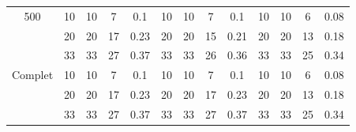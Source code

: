 \documentclass[a4paper,11pt]{article}%
\begin{document}
\begin{table}[p]
\begin{center}
\begin{tabular}{|@{}c@{}|@{}c@{}|@{}c@{}|@{}c@{}|@{}c@{}||@{}c@{}|@{}c@{}|@{}c@{}|@{}c@{}||@{}c@{}|@{}c@{}|@{}c@{}|@{}c@{}|}
  \hline
   500 & 10& 10 & 7 & 0.1 & 10& 10 & 7 & 0.1 & 10& 10 & 6 & 0.08  \\
 \cline{2-13} 
    & 20&20 & 17 & 0.23 & 20&20 & 15 & 0.21 & 20&20 & 13 & 0.18  \\
  \cline{2-13} 
    & 33&33 & 27 & 0.37 & 33&33 & 26 & 0.36 & 33&33 & 25 & 0.34  \\
  \hline
   Complet & 10&10 & 7 & 0.1 & 10&10 & 7 & 0.1 & 10&10 & 6 & 0.08  \\
 \cline{2-13} 
    & 20&20 & 17 & 0.23 & 20&20 & 17 & 0.23 & 20&20 & 13 & 0.18  \\
  \cline{2-13} 
    & 33&33 & 27 & 0.37 & 33&33 & 27 & 0.37 & 33&33 & 25 & 0.34  \\
  \hline
\end{tabular}
\end{center}
\end{table}
\end{document}
